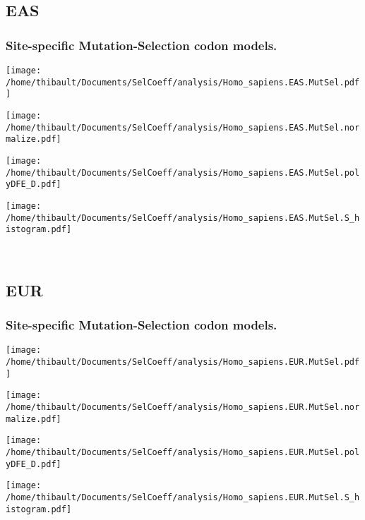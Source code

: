 \subsection{EAS} 
 
\subsubsection*{Site-specific Mutation-Selection codon models.} 
\begin{minipage}{0.49\linewidth} 
\texttt{[image: /home/thibault/Documents/SelCoeff/analysis/Homo\_sapiens.EAS.MutSel.pdf]} 
\end{minipage}
\begin{minipage}{0.49\linewidth} 
\texttt{[image: /home/thibault/Documents/SelCoeff/analysis/Homo\_sapiens.EAS.MutSel.normalize.pdf]} 
\end{minipage}
\begin{minipage}{0.49\linewidth} 
\texttt{[image: /home/thibault/Documents/SelCoeff/analysis/Homo\_sapiens.EAS.MutSel.polyDFE\_D.pdf]} 
\end{minipage}
\begin{minipage}{0.49\linewidth} 
\texttt{[image: /home/thibault/Documents/SelCoeff/analysis/Homo\_sapiens.EAS.MutSel.S\_histogram.pdf]} 
\end{minipage}
\\ 
\subsection{EUR} 
 
\subsubsection*{Site-specific Mutation-Selection codon models.} 
\begin{minipage}{0.49\linewidth} 
\texttt{[image: /home/thibault/Documents/SelCoeff/analysis/Homo\_sapiens.EUR.MutSel.pdf]} 
\end{minipage}
\begin{minipage}{0.49\linewidth} 
\texttt{[image: /home/thibault/Documents/SelCoeff/analysis/Homo\_sapiens.EUR.MutSel.normalize.pdf]} 
\end{minipage}
\begin{minipage}{0.49\linewidth} 
\texttt{[image: /home/thibault/Documents/SelCoeff/analysis/Homo\_sapiens.EUR.MutSel.polyDFE\_D.pdf]} 
\end{minipage}
\begin{minipage}{0.49\linewidth} 
\texttt{[image: /home/thibault/Documents/SelCoeff/analysis/Homo\_sapiens.EUR.MutSel.S\_histogram.pdf]} 
\end{minipage}
\\ 

